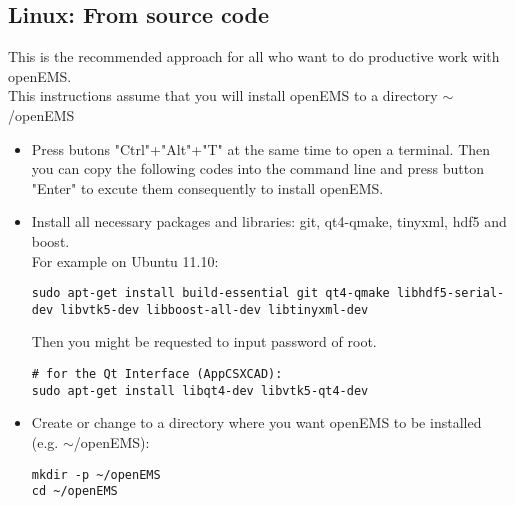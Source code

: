\subsection{Linux: From source code}
    This is the recommended approach for all who want to do productive work with openEMS.\\
    This instructions assume that you will install openEMS to a directory $\sim$/openEMS
  \begin{itemize}
    \item Press butons "Ctrl"+"Alt"+"T" at the same time to open a terminal.
    Then you can copy the following codes into the command line and press button "Enter" to excute them consequently to install openEMS.
    \item Install all necessary packages and libraries: git, qt4-qmake, tinyxml, hdf5 and boost. \\
	For example on Ubuntu 11.10:\\
      \begin{lstlisting}[style=shell]
sudo apt-get install build-essential git qt4-qmake libhdf5-serial-dev libvtk5-dev libboost-all-dev libtinyxml-dev
      \end{lstlisting}
Then you might be requested to input password of root.
      \begin{lstlisting}[style=shell]
# for the Qt Interface (AppCSXCAD):
sudo apt-get install libqt4-dev libvtk5-qt4-dev
      \end{lstlisting}
    \item Create or change to a directory where you want openEMS to be installed (e.g. $\sim$/openEMS):
      \begin{lstlisting}[style=shell]
mkdir -p ~/openEMS
cd ~/openEMS
      \end{lstlisting}
\end{itemize}
\\
